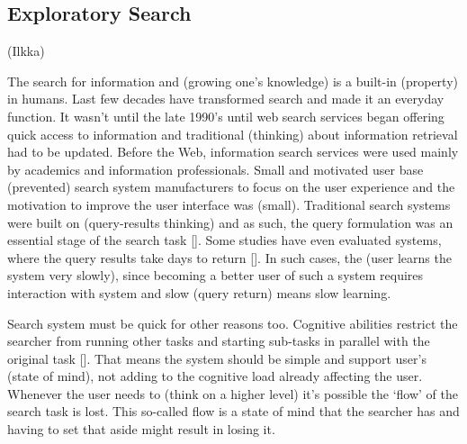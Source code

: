 \subsection{Exploratory Search}
(Ilkka)

The search for information and (growing one's knowledge) is a built-in (property) in humans. Last few decades have transformed search and made it an everyday function. It wasn't until the late 1990's until web search services began offering quick access to information and traditional (thinking) about information retrieval had to be updated. Before the Web, information search services were used mainly by academics and information professionals. Small and motivated user base (prevented) search system manufacturers to focus on the user experience and the motivation to improve the user interface was (small). Traditional search systems were built on (query-results thinking) and as such, the query formulation was an essential stage of the search task []. Some studies have even evaluated systems, where the query results take days to return []. In such cases, the (user learns the system very slowly), since becoming a better user of such a system requires interaction with system and slow (query return) means slow learning.

Search system must be quick for other reasons too. Cognitive abilities restrict the searcher from running other tasks and starting sub-tasks in parallel with the original task []. That means the system should be simple and support user's (state of mind), not adding to the cognitive load already affecting the user. Whenever the user needs to (think on a higher level) it's possible the ‘flow' of the search task is lost. This so-called flow is a state of mind that the searcher has and having to set that aside might result in losing it.

